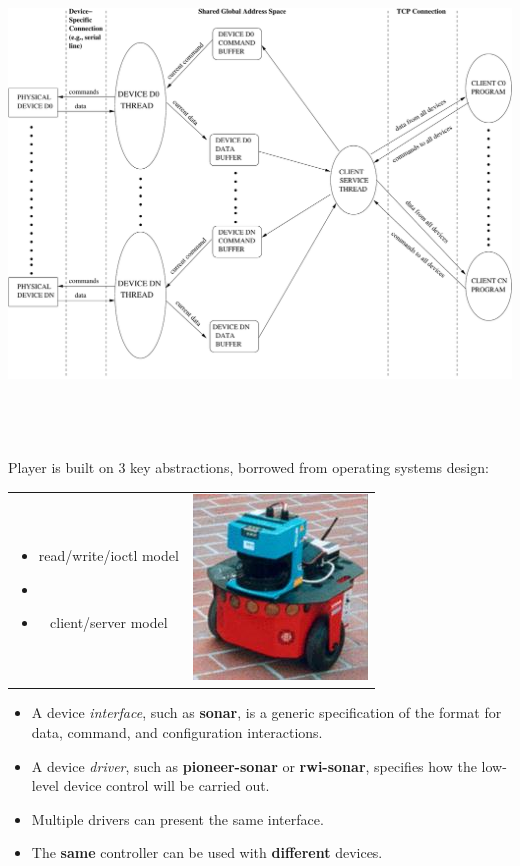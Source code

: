 \documentclass[30pt,landscape,magscalefonts]{foils}
\newcommand{\foilheadc}[1]{\foilhead{\Large \textcolor{myred}{#1}}\vspace*{-2em}}
\newenvironment{xitemize}{\begin{itemize} \itemsep 1pt}{\end{itemize}}
\begin{document}
\foilheadc{Player architecture}
\begin{center}
\includegraphics[height=130mm]{buffers.pdf}
\end{center}

\foilheadc{Player design}
Player is built on 3 key abstractions, borrowed from operating systems
design:

\begin{tabular}{cc}
\parbox{.6\textwidth}{
\begin{itemize}
\item read/write/ioctl model
\item {}
\item client/server model
\end{itemize}}
&
\parbox{.3\textwidth}{\includegraphics[width=.3\textwidth]{pioneer-2-small.jpg}}
\end{tabular}

\foilheadc{Interfaces vs.\ drivers}
\begin{xitemize}
\item A device {\em interface}, such as {\bf sonar}, is a generic
specification of the format for data, command, and configuration
interactions.
\item A device {\em driver}, such as {\bf pioneer-sonar} or {\bf
rwi-sonar}, specifies how the low-level device control will be carried
out.
\item Multiple drivers can present the same interface.
\item The {\bf same} controller can be used with {\bf different} devices.
\end{xitemize}
\end{document}
